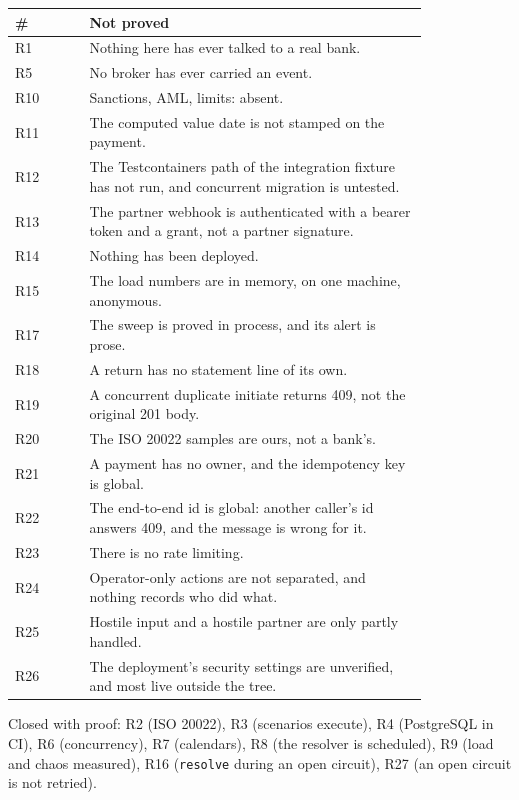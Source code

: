 \documentclass[11pt,a4paper]{article}
\begin{document}
\begin{longtable}{@{}l p{0.82\linewidth}@{}}
\toprule
\# & Not proved \\
\midrule
\endhead
R1 & Nothing here has ever talked to a real bank. \\
R5 & No broker has ever carried an event. \\
R10 & Sanctions, AML, limits: absent. \\
R11 & The computed value date is not stamped on the payment. \\
R12 & The Testcontainers path of the integration fixture has not run, and concurrent migration is untested. \\
R13 & The partner webhook is authenticated with a bearer token and a grant, not a partner signature. \\
R14 & Nothing has been deployed. \\
R15 & The load numbers are in memory, on one machine, anonymous. \\
R17 & The sweep is proved in process, and its alert is prose. \\
R18 & A return has no statement line of its own. \\
R19 & A concurrent duplicate initiate returns 409, not the original 201 body. \\
R20 & The ISO 20022 samples are ours, not a bank's. \\
R21 & A payment has no owner, and the idempotency key is global. \\
R22 & The end-to-end id is global: another caller's id answers 409, and the message is wrong for it. \\
R23 & There is no rate limiting. \\
R24 & Operator-only actions are not separated, and nothing records who did what. \\
R25 & Hostile input and a hostile partner are only partly handled. \\
R26 & The deployment's security settings are unverified, and most live outside the tree. \\
\bottomrule
\end{longtable}

Closed with proof: R2 (ISO 20022), R3 (scenarios execute), R4 (PostgreSQL in CI), R6
(concurrency), R7 (calendars), R8 (the resolver is scheduled), R9 (load and chaos measured), R16
(\texttt{resolve} during an open circuit), R27 (an open circuit is not retried).

\end{document}
